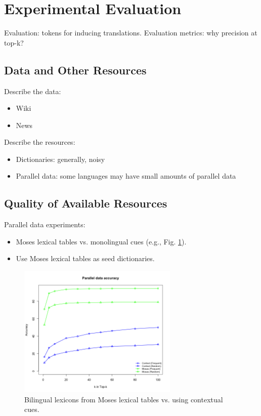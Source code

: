 \documentclass[11pt]{article}
\begin{document}
\section{Experimental Evaluation} \label{sect:exp}
\noindent Evaluation:  tokens for inducing translations.  Evaluation metrics: why precision at top-k?

\subsection{Data and Other Resources}

Describe the data:
\begin{itemize}
  \item Wiki
  \item News
\end{itemize}

\noindent Describe the resources:
\begin{itemize}
  \item Dictionaries: generally, noisy
  \item Parallel data: some languages may have small amounts of parallel data
\end{itemize}

\subsection{Quality of Available Resources}

Parallel data experiments:
\begin{itemize}
  \item Moses lexical tables vs. monolingual cues (e.g., Fig. \ref{fig:parvsmono}).
  \item Use Moses lexical tables as seed dictionaries.
\end{itemize}

\begin{figure}
\begin{center}
\includegraphics[width=3in]{figures/mostfreqrand.png}
\caption{Bilingual lexicons from Moses lexical tables vs. using contextual cues.} \label{fig:parvsmono}
\end{center}
\end{figure}
\end{document}
